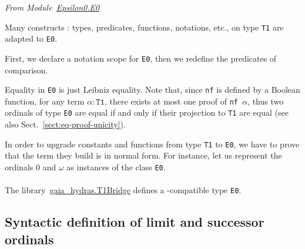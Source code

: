 \emph{From Module~\href{../theories/html/hydras.Epsilon0.E0.html\#E0}{Epsilon0.E0}}




Many constructs : types, predicates, functions, notations, etc., on type \texttt{T1} are adapted to \texttt{E0}.

First, we declare a notation scope for \texttt{E0}, then we redefine the predicates of comparison.



\label{Predicates:Lt-E0}





Equality in \texttt{E0} is just Leibniz equality. Note that, since \texttt{nf} is
defined by a Boolean function, for  any term $\alpha:\texttt{T1}$, there exists at most one proof of \texttt{nf $\alpha$}, thus two ordinals of type \texttt{E0} are
equal if and only if their projection to \texttt{T1} are equal (see also Sect.~\vref{sect:eq-proof-unicity}).

\vspace{4pt}





In order to  upgrade constants and functions from type \texttt{T1} to \texttt{E0}, we have to prove that
the term they build is in normal form.
For instance, let us represent the ordinals $0$ and $\omega$   as instances of the class \texttt{E0}.

\vspace{4pt}

\label{sect:omega-T1}




\paragraph*{\gaiasign}
 The library~\href{../theories/html/gaia_hydras.T1Bridge.html}{gaia\_hydras.T1Bridge} defines a \gaia-compatible type \texttt{E0}.



\subsection{Syntactic definition of limit and successor ordinals}

